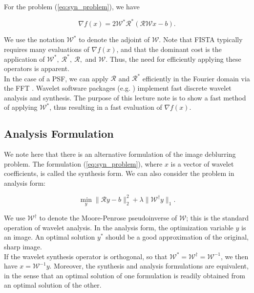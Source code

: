 \documentclass[journal]{IEEEtran}
\begin{document}
For the problem (\ref{eq:syn_problem}), we have

\begin{equation}
\label{eq:f_grad}
\nabla f(x) = 2\mathcal{W}^\ast\mathcal{R}^\ast(\mathcal{RW}x-b).
\end{equation}

\noindent We use the notation $\mathcal{W}^\ast$ to denote the adjoint of $\mathcal{W}$.  Note that FISTA typically requires many evaluations of $\nabla f(x)$, and that the dominant cost is the application of $\mathcal{W}^\ast,~\mathcal{R}^\ast,~\mathcal{R},$ and $\mathcal{W}$.  Thus, the need for efficiently applying these operators is apparent.\\

In the case of a PSF, we can apply $\mathcal{R}$ and $\mathcal{R}^\ast$ efficiently in the Fourier domain via the FFT \cite{beck_2009, hansen_2006}.  Wavelet software packages (e.g. \cite{matlab_wt_2015}) implement fast discrete wavelet analysis and synthesis.  The purpose of this lecture note is to show a fast method of applying $\mathcal{W}^\ast$, thus resulting in a fast evaluation of $\nabla f(x)$.\\


\subsection{Analysis Formulation}
We note here that there is an alternative formulation of the image deblurring problem.  The formulation (\ref{eq:syn_problem}), where $x$ is a vector of wavelet coefficients, is called the synthesis form.  We can also consider the problem in analysis form:

\begin{equation}
\label{eq:ana_form}
\min_y \|\mathcal{R}y-b\|_2^2 + \lambda \|\mathcal{W}^\dagger y\|_1.
\end{equation}

\noindent We use $\mathcal{W}^\dagger$ to denote the Moore-Penrose pseudoinverse of $\mathcal{W}$; this is the standard operation of wavelet analysis.  In the analysis form, the optimization variable $y$ is an image.  An optimal solution $y^\ast$ should be a good approximation of the original, sharp image.\\

If the wavelet synthesis operator is orthogonal, so that ${\mathcal{W}^\ast=\mathcal{W}^\dagger=\mathcal{W}^{-1}}$, we then have ${x=\mathcal{W}^{-1}y}$.  Moreover, the synthesis and analysis formulations are equivalent, in the sense that an optimal solution of one formulation is readily obtained from an optimal solution of the other.\\
\end{document}
